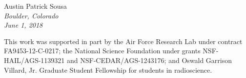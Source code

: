 \noindent Austin Patrick Sousa \\
\emph{Boulder, Colorado}\\
\emph{June 1, 2018}

\vspace{20mm}

\noindent This work was supported in part by the Air Force Research Lab under contract FA9453-12-C-0217; the National Science Foundation under grants NSF-HAIL/AGS-1139321 and NSF-CEDAR/AGS-1243176; and Oswald Garrison Villard, Jr. Graduate Student Fellowship for students in radioscience.


